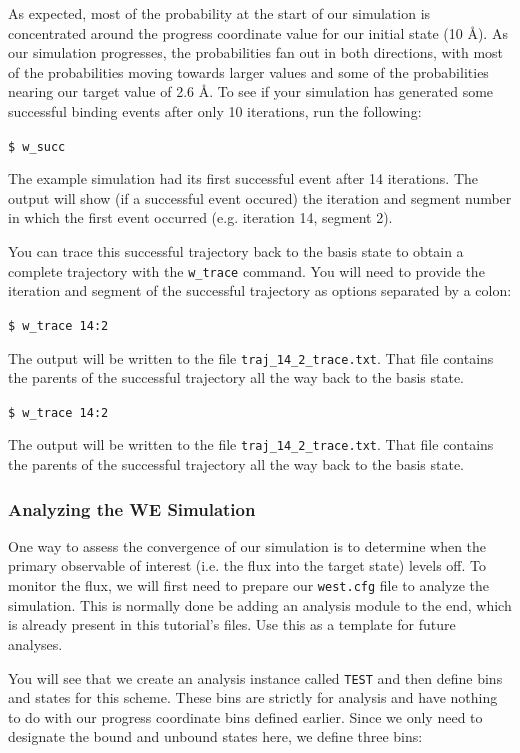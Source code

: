 \documentclass[9pt,tutorial,ASAPversion]{livecoms}
\begin{document}
As expected, most of the probability at the start of our simulation is concentrated around the progress coordinate value for our initial state (10 \AA). 
As our simulation progresses, the probabilities fan out in both directions, with most of the probabilities moving towards larger values and some of the probabilities nearing our target value of 2.6 \AA. 
To see if your simulation has generated some successful binding events after only 10 iterations, run the following:

\verb|$ w_succ|
 
The example simulation had its first successful event after 14 iterations. 
The output will show (if a successful event occured) the iteration and segment number in which the first event occurred (e.g. iteration 14, segment 2).

You can trace this successful trajectory back to the basis state to obtain a complete trajectory with the \verb|w_trace| command. 
You will need to provide the iteration and segment of the successful trajectory as options separated by a colon:
 
\verb|$ w_trace 14:2|
 
The output will be written to the file \verb|traj_14_2_trace.txt|. 
That file contains the parents of the successful trajectory all the way back to the basis state. 

\verb|$ w_trace 14:2|
 
The output will be written to the file \verb|traj_14_2_trace.txt|. 
That file contains the parents of the successful trajectory all the way back to the basis state.

\subsubsection{Analyzing the WE Simulation}

One way to assess the convergence of our simulation is to determine when the primary observable of interest (i.e. the flux into the target state) levels off. 
To monitor the flux, we will first need to prepare our \verb|west.cfg| file to analyze the simulation. 
This is normally done be adding an analysis module to the end, which is already present in this tutorial’s files. 
Use this as a template for future analyses.

You will see that we create an analysis instance called \verb|TEST| and then define bins and states for this scheme. 
These bins are strictly for analysis and have nothing to do with our progress coordinate bins defined earlier. 
Since we only need to designate the bound and unbound states here, we define three bins:
 
\end{document}
